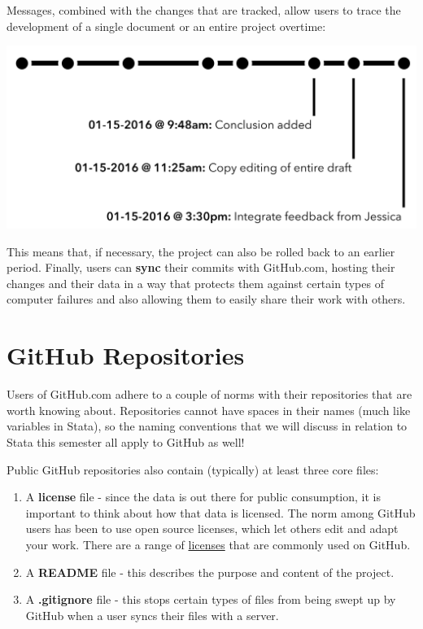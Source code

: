 \documentclass[]{book}
\theoremstyle{definition}
\theoremstyle{definition}
\theoremstyle{remark}
\begin{document}
Messages, combined with the changes that are tracked, allow users to
trace the development of a single document or an entire project
overtime:

\includegraphics[width=1\linewidth]{images/gitFlow04}

This means that, if necessary, the project can also be rolled back to an
earlier period. Finally, users can \textbf{sync} their commits with
GitHub.com, hosting their changes and their data in a way that protects
them against certain types of computer failures and also allowing them
to easily share their work with others.

\section{GitHub Repositories}\label{github-repositories}

Users of GitHub.com adhere to a couple of norms with their repositories
that are worth knowing about. Repositories cannot have spaces in their
names (much like variables in Stata), so the naming conventions that we
will discuss in relation to Stata this semester all apply to GitHub as
well!

Public GitHub repositories also contain (typically) at least three core
files:

\begin{enumerate}
\def\labelenumi{\arabic{enumi}.}
\item
  A \textbf{license} file - since the data is out there for public
  consumption, it is important to think about how that data is licensed.
  The norm among GitHub users has been to use open source licenses,
  which let others edit and adapt your work. There are a range of
  \href{http://choosealicense.com}{licenses} that are commonly used on
  GitHub.
\item
  A \textbf{README} file - this describes the purpose and content of the
  project.
\item
  A \textbf{.gitignore} file - this stops certain types of files from
  being swept up by GitHub when a user syncs their files with a server.
\end{enumerate}
\end{document}
